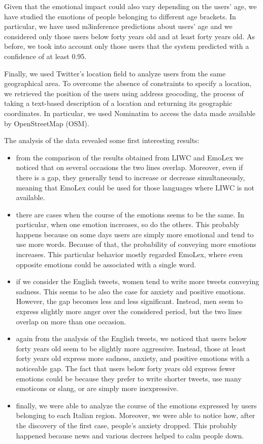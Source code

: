 Given that the emotional impact could also vary depending on the users' age, we have studied the emotions of people belonging to different age brackets. In particular, we have used m3inference predictions about users' age and we considered only those users below forty years old and at least forty years old. As before, we took into account only those users that the system predicted with a confidence of at least 0.95. 

Finally, we used Twitter's location field to analyze users from the same geographical area. To overcome the absence of constraints to specify a location, we retrieved the position of the users using address geocoding, the process of taking a text-based description of a location and returning its geographic coordinates. In particular, we used Nominatim to access the data made available by OpenStreetMap (OSM).

The analysis of the data revealed some first interesting results:

\begin{itemize}
	\item from the comparison of the results obtained from LIWC and EmoLex we noticed that on several occasions the two lines overlap. Moreover, even if there is a gap, they generally tend to increase or decrease simultaneously, meaning that EmoLex could be used for those languages where LIWC is not available.
	\item there are cases when the course of the emotions seems to be the same. In particular, when one emotion increases, so do the others. This probably happens because on some days users are simply more emotional and tend to use more words. Because of that, the probability of conveying more emotions increases. This particular behavior mostly regarded EmoLex, where even opposite emotions could be associated with a single word.
	\item if we consider the English tweets, women tend to write more tweets conveying sadness. This seems to be also the case for anxiety and positive emotions. However, the gap becomes less and less significant. Instead, men seem to express slightly more anger over the considered period, but the two lines overlap on more than one occasion.
	\item again from the analysis of the English tweets, we noticed that users below forty years old seem to be slightly more aggressive. Instead, those at least forty years old express more sadness, anxiety, and positive emotions with a noticeable gap. The fact that users below forty years old express fewer emotions could be because they prefer to write shorter tweets, use many emoticons or slang, or are simply more inexpressive.
	\item finally, we were able to analyze the course of the emotions expressed by users belonging to each Italian region. Moreover, we were able to notice how, after the discovery of the first case, people's anxiety dropped. This probably happened because news and various decrees helped to calm people down.
\end{itemize}

